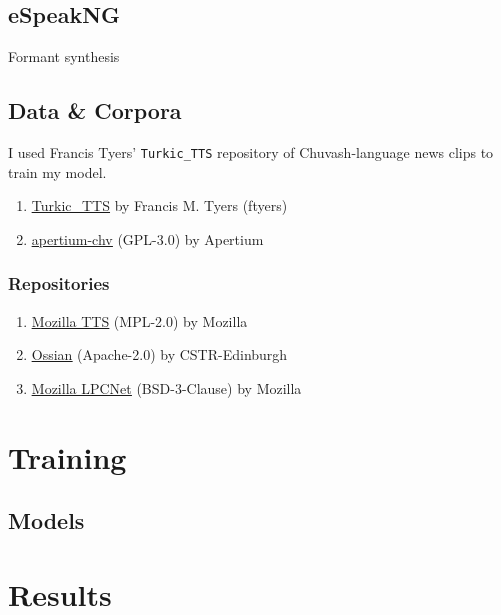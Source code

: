 \documentclass[11pt,a4paper]{article}
\begin{document}
\subsection{eSpeakNG}\label{ssec:espeak}
Formant synthesis

\subsection{Data \& Corpora}\label{ssec:data}
I used Francis Tyers' \texttt{Turkic\_TTS} repository of Chuvash-language news clips to train my model.

\begin{enumerate}
	\item \href{https://github.com/ftyers/Turkic_TTS}{\underline{Turkic\_TTS}} by Francis M. Tyers (ftyers)
	\item \href{https://github.com/apertium/apertium-chv}{\underline{apertium-chv}} (GPL-3.0) by Apertium
\end{enumerate}

\subsubsection{Repositories} %
\begin{enumerate}
	\item \href{https://github.com/mozilla/TTS}{\underline{Mozilla TTS}} (MPL-2.0) by Mozilla
	\item \href{https://github.com/CSTR-Edinburgh/Ossian}{\underline{Ossian}} (Apache-2.0) by CSTR-Edinburgh
	\item \href{https://github.com/mozilla/LPCNet}{\underline{Mozilla LPCNet}} (BSD-3-Clause) by Mozilla
\end{enumerate}

\section{Training}


\subsection{Models}\label{ssec:models}


\section{Results}\label{sect:results}
\end{document}
